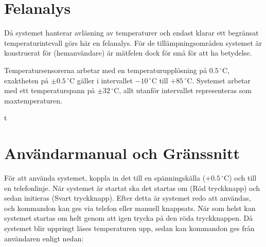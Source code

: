 \documentclass[a4paper,11pt]{article}
\begin{document}
\section{Felanalys}

Då systemet hanterar avläsning av temperaturer och endast klarar ett begränsat temperaturintevall
görs här en felanalys. För de tillämpningsområden systemet är konstruerat för (hemanvändare) 
är mätfelen dock för små för att ha betydelse.

Temperatursensorerna arbetar med en temperaturupplösning på $0.5\,^{\circ}\mathrm{C}$, exaktheten på $\pm 0.5\,^{\circ}\mathrm{C}$ gäller i intervallet $-10\,^{\circ}\mathrm{C}$ till $+85\,^{\circ}\mathrm{C}$.
Systemet arbetar med ett temperaturspann på $\pm 32\,^{\circ}\mathrm{C}$, allt utanför intervallet representeras som maxtemperaturen.

\pagebreak

	\appendix
	\renewcommand{\appendixpagename}{Appendix}t
	\appendixpage
	\renewcommand{\appendixtocname}{Appendix}

	\addappheadtotoc

	\section{Användarmanual och Gränssnitt}
	\label{sec:Manual}
	För att använda systemet, koppla in det till en spänningskälla ($+0.5\,^{\circ}\mathrm{C}$) och till en telefonlinje.
	När systemet är startat ska det startas om (Röd tryckknapp) och sedan initieras (Svart tryckknapp).
	Efter detta är systemet redo att användas, och kommandon kan ges via telefon eller manuell knappsats.
	När som helst kan systemet startas om helt genom att igen trycka på den röda tryckknappen.
	Då systemet blir uppringt läses temperaturen upp, sedan kan kommandon ges från användaren enligt nedan:\\
\end{document}
